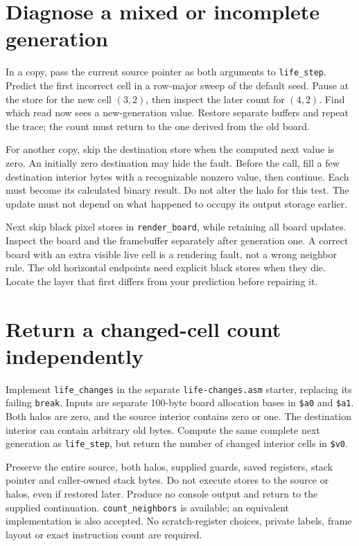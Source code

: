 \section{Diagnose a mixed or incomplete generation}

In a copy, pass the current source pointer as both arguments to \texttt{life\_step}.
Predict the first incorrect cell in a row-major sweep of the default seed. Pause
at the store for the new cell $(3,2)$, then inspect the later count for $(4,2)$.
Find which read now sees a new-generation value. Restore separate buffers and
repeat the trace; the count must return to the one derived from the old board.

For another copy, skip the destination store when the computed next value is zero.
An initially zero destination may hide the fault. Before the call, fill a few
destination interior bytes with a recognizable nonzero value, then continue.
Each must become its calculated binary result. Do not alter the halo for this test.
The update must not depend on what happened to occupy its output storage earlier.

Next skip black pixel stores in \texttt{render\_board}, while retaining all board
updates. Inspect the board and the framebuffer separately after generation one.
A correct board with an extra visible live cell is a rendering fault, not a wrong
neighbor rule. The old horizontal endpoints need explicit black stores when they
die. Locate the layer that first differs from your prediction before repairing it.

\section{Return a changed-cell count independently}

Implement \texttt{life\_changes} in the separate \texttt{life-changes.asm} starter,
replacing its failing \texttt{break}. Inputs are separate 100-byte board allocation
bases in \texttt{\$a0} and \texttt{\$a1}. Both halos are zero, and the source interior
contains zero or one. The destination interior can contain arbitrary old bytes.
Compute the same complete next generation as \texttt{life\_step}, but return the
number of changed interior cells in \texttt{\$v0}.

Preserve the entire source, both halos, supplied guards, saved registers, stack
pointer and caller-owned stack bytes. Do not execute stores to the source or halos,
even if restored later. Produce no console output and return to the supplied
continuation. \texttt{count\_neighbors} is available; an equivalent implementation
is also accepted. No scratch-register choices, private labels, frame layout or
exact instruction count are required.

